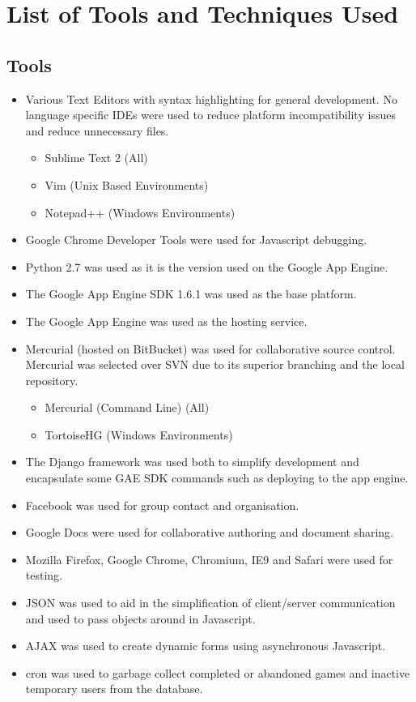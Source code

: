 
\section{List of Tools and Techniques Used}
\subsection{Tools}
\begin{itemize}
	\setlength{\itemsep}{1pt}
  	\setlength{\parskip}{0pt}
  	\setlength{\parsep}{0pt}
	\item Various Text Editors with syntax highlighting for general development. No language specific IDEs were used to reduce platform incompatibility issues and reduce unnecessary files.
	\begin{itemize}
		\setlength{\itemsep}{1pt}
  		\setlength{\parskip}{0pt}
  		\setlength{\parsep}{0pt}
		\item {Sublime Text 2 (All)}
		\item {Vim (Unix Based Environments)}
		\item {Notepad++ (Windows Environments)}
	\end{itemize}
	\item Google Chrome Developer Tools were used for Javascript debugging.
	\item Python 2.7 was used as it is the version used on the Google App Engine.
	\item The Google App Engine SDK 1.6.1 was used as the base platform.
	\item The Google App Engine was used as the hosting service.
	\item Mercurial (hosted on BitBucket) was used for collaborative source control. Mercurial was selected over SVN due to its superior branching and the local repository.
	\begin{itemize}
		\setlength{\itemsep}{1pt}
  		\setlength{\parskip}{0pt}
  		\setlength{\parsep}{0pt}
		\item {Mercurial (Command Line) (All)}
		\item {TortoiseHG (Windows Environments)}
	\end{itemize}
	\item The Django framework was used both to simplify development and encapsulate some GAE SDK commands such as deploying to the app engine.
	\item Facebook was used for group contact and organisation.
	\item Google Docs were used for collaborative authoring and document sharing.
	\item Mozilla Firefox, Google Chrome, Chromium, IE9 and Safari were used for testing.
	\item JSON was used to aid in the simplification of client/server communication and used to pass objects around in Javascript.
	\item AJAX was used to create dynamic forms using asynchronous Javascript.
	\item cron was used to garbage collect completed or abandoned games and inactive temporary users from the database.
\end{itemize}

